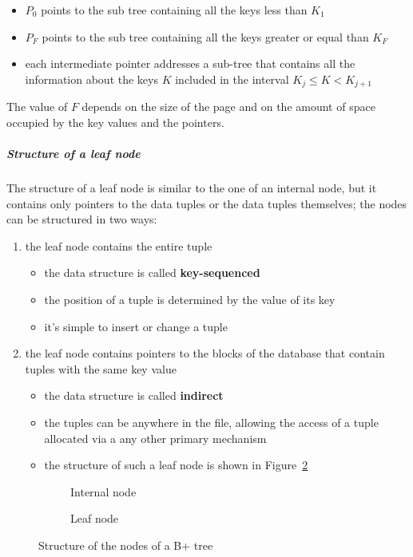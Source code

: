 \documentclass[english]{article}
\begin{document}
\begin{itemize}
  \item \(P_0\) points to the sub tree containing all the keys less than \(K_1\)
  \item \(P_F\) points to the sub tree containing all the keys greater or equal than \(K_F\)
  \item each intermediate pointer addresses a sub-tree that contains all the information about the keys \(K\) included in the interval \(K_j \leq K < K_{j + 1}\)
\end{itemize}

The value of \(F\) depends on the size of the page and on the amount of space occupied by the key values and the pointers.

\subparagraph*{Structure of a leaf node}
The structure of a leaf node is similar to the one of an internal node, but it contains only pointers to the data tuples or the data tuples themselves;
the nodes can be structured in two ways:

\begin{enumerate}
  \item the leaf node contains the entire tuple
        \begin{itemize}
          \item the data structure is called \textbf{key-sequenced}
          \item the position of a tuple is determined by the value of its key
          \item it's simple to insert or change a tuple
        \end{itemize}
  \item the leaf node contains pointers to the blocks of the database that contain tuples with the same key value
        \begin{itemize}
          \item the data structure is called \textbf{indirect}
          \item the tuples can be anywhere in the file, allowing the access of a tuple allocated via a any other primary mechanism
          \item the structure of such a leaf node is shown in Figure~\ref{subfig:b-tree-leaf-node}
        \end{itemize}
\end{enumerate}

\begin{figure}[htbp]
  \centering
  \bigskip
  \begin{subfigure}{0.99\textwidth}
    \centering
    \bigskip
    \caption{Internal node}
    \label{subfig:b-tree-internal-node}
    \bigskip
  \end{subfigure}
  \bigskip
  \begin{subfigure}{0.99\textwidth}
    \centering
    \bigskip
    \caption{Leaf node}
    \label{subfig:b-tree-leaf-node}
    \bigskip
  \end{subfigure}
  \caption{Structure of the nodes of a B+ tree}
  \label{fig:b-tree-structure}
\end{figure}
\end{document}

